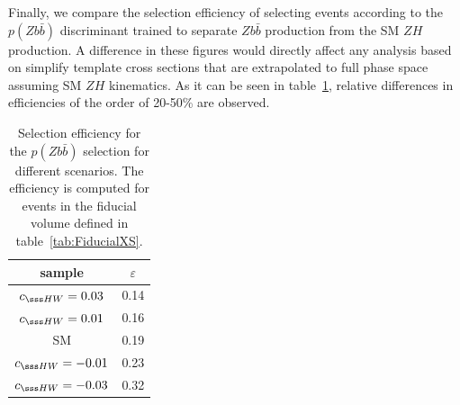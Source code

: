 Finally, we compare the selection efficiency of selecting events according to the $p(Z
b\bar{b})$ discriminant trained to separate $Z b\bar{b}$ production from the SM $Z H$
production. A difference in these figures would directly affect any analysis based on
simplify template cross sections that are extrapolated to full phase space assuming SM $Z
H$ kinematics. As it can be seen in table~\ref{tab:bdt_efficiency}, relative differences
in efficiencies of the order of 20-50\% are observed.

\begin{table}
\centering
\begin{tabular}{||c|c||}
sample & $\varepsilon$  \\
\hline
$c_{\sss HW} = 0.03$ & 0.14 \\
$c_{\sss HW} = 0.01$ & 0.16 \\
SM & 0.19 \\
$c_{\sss HW} = -0.01$ & 0.23 \\
$c_{\sss HW} = -0.03$ & 0.32 \\
\end{tabular}
\caption{
\label{tab:bdt_efficiency}
Selection efficiency for the $p(Z b\bar{b})$ selection for different scenarios. The
efficiency is computed for events in the fiducial volume defined in table~\ref{tab:FiducialXS}.
}
\end{table}



